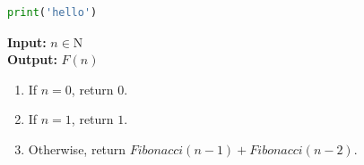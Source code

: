 \documentclass[twocolumn]{tem}
\begin{document}



\appendix
{}
\begin{lstlisting}[language=Python]
print('hello')
\end{lstlisting}



\begin{algorithm}
\caption{recursive Fibonacci}
\label{alg:fibonacci}
\textbf{Input:} $n \in \mathrm{N}$\\
\textbf{Output:} $F(n)$
\begin{enumerate}
\item If $n=0$, return $0$.
\item If $n=1$, return $1$.
\item Otherwise, return $\textit{Fibonacci}(n-1)+\textit{Fibonacci}(n-2)$.
\end{enumerate}
\end{algorithm}

\clearpage
\nocite{*}
\end{document}
